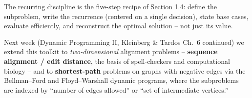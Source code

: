 \documentclass[11pt]{article}
\begin{document}
The recurring discipline is the five-step recipe of Section 1.4: define the subproblem,
write the recurrence (centered on a single decision), state base cases, evaluate
efficiently, and reconstruct the optimal solution -- not just its value.

Next week (Dynamic Programming II, Kleinberg \& Tardos Ch.\ 6 continued) we extend this
toolkit to \emph{two-dimensional} alignment problems -- \textbf{sequence alignment / edit
distance}, the basis of spell-checkers and computational biology -- and to
\textbf{shortest-path} problems on graphs with negative edges via the Bellman--Ford and
Floyd--Warshall dynamic programs, where the subproblems are indexed by ``number of edges
allowed'' or ``set of intermediate vertices.''
\end{document}
